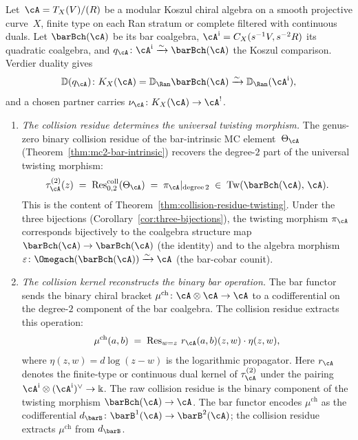 \begin{theorem}
\label{thm:rmatrix-koszul-inverse}
Let~$\cA=T_X(V)/(R)$ be a modular Koszul chiral algebra on a smooth projective
curve~$X$, finite type on each Ran stratum or complete filtered with
continuous duals. Let $\barBch(\cA)$ be its bar coalgebra,
$\cA^{\mathrm i}=C_X(s^{-1}V,s^{-2}R)$ its quadratic coalgebra, and
$q_\cA\colon\cA^{\mathrm i}\xrightarrow{\sim}\barBch(\cA)$ the
Koszul comparison. Verdier duality gives
\[
\mathbb D(q_\cA)\colon
K_X(\cA)=\mathbb D_{\Ran}\barBch(\cA)
\xrightarrow{\sim}\mathbb D_{\Ran}(\cA^{\mathrm i}),
\]
and a chosen partner carries $\nu_\cA\colon K_X(\cA)\to\cA^!$.
\begin{enumerate}[label=\textup{(\roman*)}]
\item \emph{The collision residue determines the universal twisting
 morphism.} The genus-zero binary collision residue of the
 bar-intrinsic MC element~$\Theta_\cA$
 \textup{(}Theorem~\textup{\ref{thm:mc2-bar-intrinsic})}
 recovers the degree-$2$ part of the universal twisting morphism:
 \begin{equation}\label{eq:rmatrix-koszul-inverse-twisting}
 \tau^{(2)}_\cA(z)
 \;=\;
 \operatorname{Res}^{\mathrm{coll}}_{0,2}(\Theta_\cA)
 \;=\;
 \pi_\cA|_{\mathrm{degree}\,2}
 \;\in\;
 \mathrm{Tw}(\barBch(\cA),\, \cA).
 \end{equation}
 This is the content of
 Theorem~\textup{\ref{thm:collision-residue-twisting}}.
 Under the three bijections
 \textup{(}Corollary~\textup{\ref{cor:three-bijections})},
 the twisting morphism $\pi_\cA$ corresponds bijectively to
 the coalgebra structure map $\barBch(\cA) \to \barBch(\cA)$
 \textup{(}the identity\textup{)} and to the algebra morphism
 $\varepsilon\colon \Omegach(\barBch(\cA))
 \xrightarrow{\sim} \cA$
 \textup{(}the bar-cobar counit\textup{)}.

\item \emph{The collision kernel reconstructs the binary bar operation.}
 The bar functor sends the binary chiral bracket
 $\mu^{\mathrm{ch}}\colon \cA \otimes \cA \to \cA$
 to a codifferential on the degree-$2$ component of the bar
 coalgebra. The collision residue extracts this operation:
 \begin{equation}\label{eq:bar-inverse-degree2}
 \mu^{\mathrm{ch}}(a, b)
 \;=\;
 \operatorname{Res}_{w = z}\,
 r_\cA(a, b)(z, w) \cdot \eta(z, w),
 \end{equation}
 where $\eta(z,w) = d\log(z - w)$ is the logarithmic propagator.
 Here $r_\cA$ denotes the finite-type or continuous dual kernel of
 $\tau^{(2)}_\cA$ under the pairing
 $\cA^{\mathrm i}\otimes(\cA^{\mathrm i})^\vee\to\Bbbk$.
 The raw collision residue is the binary component of the twisting
 morphism $\barBch(\cA)\to\cA$.
 The bar functor encodes $\mu^{\mathrm{ch}}$ as the codifferential
 $d_{\barB}\colon \barB^1(\cA) \to \barB^2(\cA)$; the collision
 residue extracts $\mu^{\mathrm{ch}}$ from $d_{\barB}$.


\end{enumerate}
\end{theorem}
